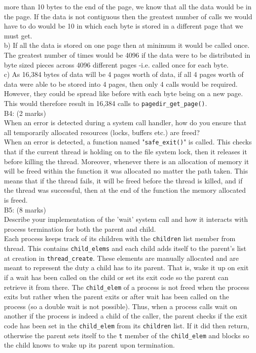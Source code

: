 \documentclass[11pt, a4paper]{article}
\begin{document}
more than 10 bytes to the end of the page, we know that all the data would be in the page. If the
data is not contiguous then the greatest number of calls we would have to do would be 10 in
which each byte is stored in a different page that we must get. \\
b) If all the data is stored on one page then at minimum it would be called once. The greatest number
of times would be 4096 if the data were to be distributed in byte sized pieces across 4096 different pages
-i.e. called once for each byte. \\
c) As 16,384 bytes of data will be 4 pages worth of data, if all 4 pages worth of data were able to be stored
into 4 pages, then only 4 calls would be required. However, they could be spread like before
with each byte being on a new page. This would therefore result in 16,384 calls to \verb|pagedir_get_page()|.\bigskip\\
B4: (2 marks)\\
When an error is detected during a system call handler, how do you ensure that all 
temporarily allocated resources (locks, buffers etc.) are freed?\bigskip\\
When an error is detected, a function named "\verb|safe_exit()|" is called. This checks that if the current thread is holding
on to the file system lock, then it releases it before killing the thread. Moreover, whenever there is an allocation of memory
it will be freed within the function it was allocated no matter the path taken. This means that if the thread fails, it will
be freed before the thread is killed, and if the thread was successful, then at the end of the function the memory allocated is freed.\bigskip\\
B5: (8 marks)\\
Describe your implementation of the 'wait' system call and how it interacts with
process termination for both the parent and child.\bigskip\\
Each process keeps track of its children with the
\verb|children| list member from thread. This contains
\verb|child_elems| and each child adds itself to the
parent's list at creation in \verb|thread_create|. These
elements are manually allocated and are meant to represent
the duty a child has to its parent. That is, wake it up
on exit if a wait has been called on the child or
set its exit
code so the parent can retrieve it from there. The
\verb|child_elem| of a process is not freed when the
process exits but rather when the parent exits or
after wait has been called on the process (so a double
wait is not possible). Thus, when a process calls
wait on another if the process is indeed a child
of the caller, the parent checks if the exit code
has been set in the \verb|child_elem| from its
\verb|children| list. If it did then return, otherwise
the parent sets itself to the \verb|t| member of the
\verb|child_elem| and blocks so the child knows to wake up its parent upon termination.
\end{document}
